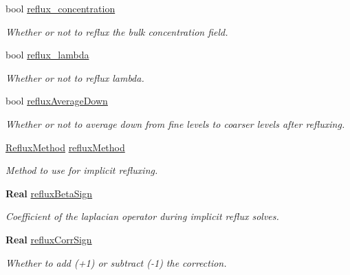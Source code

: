 \begin{DoxyCompactItemize}
bool \hyperlink{struct_mushy_layer_options_a57c02aa5dbb5863680cdeee3e6adfc9e}{reflux\+\_\+concentration}
\begin{DoxyCompactList}\small\item\em Whether or not to reflux the bulk concentration field. \end{DoxyCompactList}\item 
bool \hyperlink{struct_mushy_layer_options_a7fcaaba35b9ec20a078c88bf199f4247}{reflux\+\_\+lambda}
\begin{DoxyCompactList}\small\item\em Whether or not to reflux lambda. \end{DoxyCompactList}\item 
bool \hyperlink{struct_mushy_layer_options_a5f49a32e621d8c69bf2c6dae577b5db2}{reflux\+Average\+Down}
\begin{DoxyCompactList}\small\item\em Whether or not to average down from fine levels to coarser levels after refluxing. \end{DoxyCompactList}\item 
\mbox{\label{struct_mushy_layer_options_adcec185e701cfd6e7566065b0a4453d5}} 
\hyperlink{mushy_layer_opt_8h_a5a98ef78cd7e0d1e6f335bd304c34bc0}{Reflux\+Method} \hyperlink{struct_mushy_layer_options_adcec185e701cfd6e7566065b0a4453d5}{reflux\+Method}
\begin{DoxyCompactList}\small\item\em Method to use for implicit refluxing. \end{DoxyCompactList}\item 
\textbf{ Real} \hyperlink{struct_mushy_layer_options_a8cf08767319ec63a4b6a0cf3f634cc81}{reflux\+Beta\+Sign}
\begin{DoxyCompactList}\small\item\em Coefficient of the laplacian operator during implicit reflux solves. \end{DoxyCompactList}\item 
\textbf{ Real} \hyperlink{struct_mushy_layer_options_aa978db9bd7ffd2f72f72614f1cc2e769}{reflux\+Corr\+Sign}
\begin{DoxyCompactList}\small\item\em Whether to add (+1) or subtract (-\/1) the correction. \end{DoxyCompactList}\item 
\mbox{\label{struct_mushy_layer_options_aa8e946ee69340434302f12e9e5a18ac9}} 

\end{DoxyCompactItemize}
